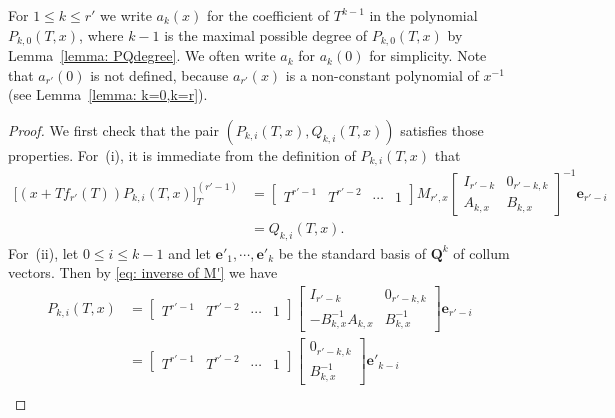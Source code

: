 \documentclass[11pt]{amsart}
\theoremstyle{definition}
\numberwithin{equation}{subsection}
\theoremstyle{plain}
\theoremstyle{plain}
\theoremstyle{plain}
\theoremstyle{plain}
\theoremstyle{plain}
\theoremstyle{plain}
\theoremstyle{plain}
\theoremstyle{plain}
\theoremstyle{plain}
\theoremstyle{plain}
\theoremstyle{plain}
\theoremstyle{plain}
\theoremstyle{definition}
\theoremstyle{definition}
\theoremstyle{definition}
\theoremstyle{remark}
\renewcommand{\(}{\textup{(}}
\renewcommand{\)}{\textup{)}}
\newcommand{\Q}{\mathbf{Q}}
\begin{document}
For $1\leq k\leq r'$ we write $a_k(x)$ for the coefficient of $T^{k-1}$ in the polynomial $P_{k,0}(T,x)$, where $k-1$ is the maximal possible degree of $P_{k,0}(T,x)$ by Lemma~\ref{lemma: PQdegree}. We often write $a_k$ for $a_k(0)$ for simplicity. Note that $a_{r'}(0)$ is not defined, because $a_{r'}(x)$ is a non-constant polynomial of $x^{-1}$(see Lemma~\ref{lemma: k=0,k=r}).


\begin{proof}
We first check that the pair $(P_{k,i}(T,x),Q_{k,i}(T,x))$ satisfies those properties. For~(i), it is immediate from the definition of $P_{k,i}(T,x)$ that
\begin{align*}
\big[(x+Tf_{r'}(T))P_{k,i}(T,x)\big]_{T}^{(r'-1)} &=
            \begin{bmatrix}
                T^{r'-1} & T^{r'-2} & \cdots & 1
            \end{bmatrix}
            M_{r',x}
            \begin{bmatrix}
                I_{r'-k} & 0_{r'-k,k} \\
                A_{k,x} & B_{k,x}
            \end{bmatrix}^{-1}
            \mathbf{e}_{r'-i}
            \\
            &=Q_{k,i}(T,x).
        \end{align*}
For~(ii), let $0\leq i\leq k-1$ and let $\mathbf{e}'_1,\cdots,\mathbf{e}'_{k}$ be the standard basis of $\Q^k$ of collum vectors. Then by \eqref{eq: inverse of M'} we have
\begin{align*}
P_{k,i}(T,x)&=
            \begin{bmatrix}
                T^{r'-1} & T^{r'-2} &\cdots & 1
            \end{bmatrix}
            \begin{bmatrix}
                I_{r'-k} & 0_{r'-k,k} \\
                -B_{k,x}^{-1}A_{k,x} & B_{k,x}^{-1}
            \end{bmatrix}\mathbf{e}_{r'-i}\\
            &=
            \begin{bmatrix}
                T^{r'-1} & T^{r'-2} &\cdots & 1
            \end{bmatrix}
            \begin{bmatrix}
                0_{r'-k,k} \\
                B_{k,x}^{-1}
            \end{bmatrix} \mathbf{e}'_{k-i} \\

\end{align*}
\end{proof}
\end{document}
